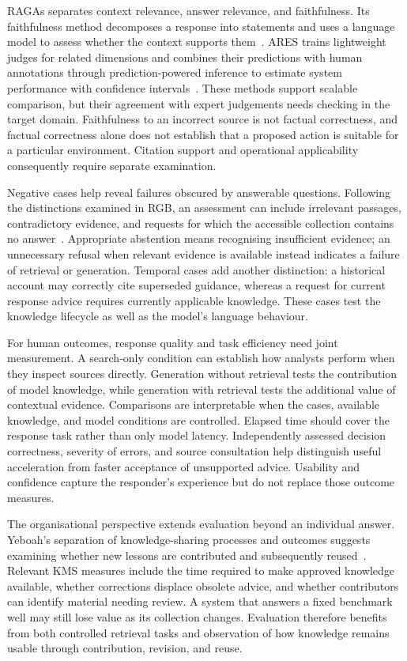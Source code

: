 RAGAs separates context relevance, answer relevance, and faithfulness. Its faithfulness method decomposes a response into statements and uses a language model to assess whether the context supports them~\cite{ref039}. ARES trains lightweight judges for related dimensions and combines their predictions with human annotations through prediction-powered inference to estimate system performance with confidence intervals~\cite{ref040}. These methods support scalable comparison, but their agreement with expert judgements needs checking in the target domain. Faithfulness to an incorrect source is not factual correctness, and factual correctness alone does not establish that a proposed action is suitable for a particular environment. Citation support and operational applicability consequently require separate examination.

Negative cases help reveal failures obscured by answerable questions. Following the distinctions examined in RGB, an assessment can include irrelevant passages, contradictory evidence, and requests for which the accessible collection contains no answer~\cite{ref038}. Appropriate abstention means recognising insufficient evidence; an unnecessary refusal when relevant evidence is available instead indicates a failure of retrieval or generation. Temporal cases add another distinction: a historical account may correctly cite superseded guidance, whereas a request for current response advice requires currently applicable knowledge. These cases test the knowledge lifecycle as well as the model's language behaviour.

For human outcomes, response quality and task efficiency need joint measurement. A search-only condition can establish how analysts perform when they inspect sources directly. Generation without retrieval tests the contribution of model knowledge, while generation with retrieval tests the additional value of contextual evidence. Comparisons are interpretable when the cases, available knowledge, and model conditions are controlled. Elapsed time should cover the response task rather than only model latency. Independently assessed decision correctness, severity of errors, and source consultation help distinguish useful acceleration from faster acceptance of unsupported advice. Usability and confidence capture the responder's experience but do not replace those outcome measures.

The organisational perspective extends evaluation beyond an individual answer. Yeboah's separation of knowledge-sharing processes and outcomes suggests examining whether new lessons are contributed and subsequently reused~\cite{ref093}. Relevant KMS measures include the time required to make approved knowledge available, whether corrections displace obsolete advice, and whether contributors can identify material needing review. A system that answers a fixed benchmark well may still lose value as its collection changes. Evaluation therefore benefits from both controlled retrieval tasks and observation of how knowledge remains usable through contribution, revision, and reuse.

